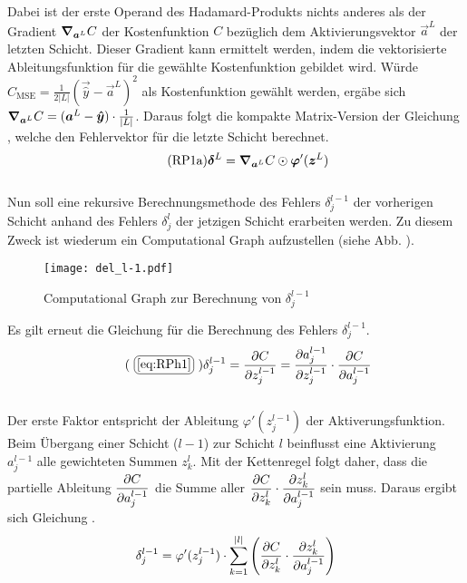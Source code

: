 \begin{appendices}
Dabei ist der erste Operand des Hadamard-Produkts nichts anderes als
der Gradient $\bm{\nabla}_{\bm{a}^L} C$ der Kostenfunktion $C$ bezüglich dem Aktivierungsvektor
$\vec{a}^L$ der letzten Schicht. Dieser Gradient kann ermittelt werden, indem die
vektorisierte Ableitungsfunktion für die gewählte Kostenfunktion gebildet wird.
Würde $C_{\text{MSE}} = \frac{1}{2|L|}(\vec{\hat{y}} -
\vec{a}^L)^2$ als Kostenfunktion gewählt werden,
ergäbe sich $\bm{\nabla}_{\bm{a}^L} C = (\bm{a}^L - \bm{\hat{y}}) \cdot \frac{1}{|L|}$.
\para{}
Daraus folgt die kompakte Matrix-Version  der Gleichung
, welche den Fehlervektor für die letzte Schicht berechnet.
\\
\begin{equation}\tag{RP1a}\label{eq:RP1a}
  \bm{\delta}^L = \bm{\nabla}_{\bm{a}^L}C \odot \bm{\varphi}'(\bm{z}^L)
\end{equation}
\\
Nun soll eine rekursive Berechnungsmethode des Fehlers $\delta_j^{l-1}$
der vorherigen Schicht anhand des Fehlers $\delta_j^l$ der jetzigen Schicht
erarbeiten werden. Zu diesem Zweck ist wiederum ein Computational Graph aufzustellen
(siehe Abb. ).
\para{}
\begin{figure}[h!]
  \centering
  \texttt{[image: del\_l-1.pdf]}
  \caption{Computational Graph zur Berechnung von $\delta_j^{l-1}$}
  \label{fig:cg_L-1}
\end{figure}
\para{}
Es gilt erneut die Gleichung  für die Berechnung des Fehlers $\delta_j^{l-1}$.
\\
\begin{equation}\tag{\refbox{eq:RPh1}}
  \delta_j^{l-1} = \partderiv{C}{z_j^{l-1}} = \partderiv{a_j^{l-1}}{z_j^{l-1}} \cdot \partderiv{C}{a_j^{l-1}}
\end{equation}
\\
Der erste Faktor entspricht der Ableitung $\varphi'(z_j^{l-1})$ der Aktiverungsfunktion.
Beim Übergang einer Schicht ($l-1$) zur Schicht $l$ beinflusst eine Aktivierung
$a_j^{l-1}$ alle gewichteten Summen $z_k^l$. Mit der Kettenregel folgt daher,
dass die partielle Ableitung $\displaystyle\frac{\partial C}{\partial a_j^{l-1}}$ die Summe aller
$\displaystyle\frac{\partial C}{\partial z_k^l} \cdot \displaystyle\frac{\partial z_k^l}{\partial a_j^{l-1}}$ sein muss.
Daraus ergibt sich Gleichung .
\\
\begin{equation}\label{eq:RPh2}
  \delta_j^{l-1} = \varphi'(z_j^{l-1}) \cdot \sum_{k=1}^{|l|} \left( \partderiv{C}{z_k^l} \cdot \partderiv{z_k^l}{a_j^{l-1}} \right)

\end{equation}
\end{appendices}
